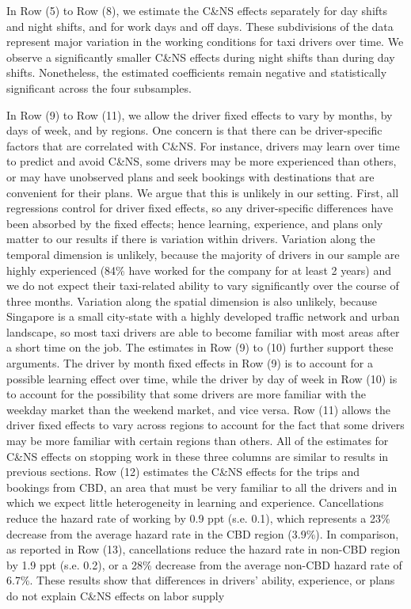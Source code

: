 \documentclass[reviewmode,AEJ]{AEA}
\begin{document}
In Row (5) to Row (8), we  estimate the C\&NS effects separately for day shifts and night shifts, and for work days and off days. These subdivisions of the data represent major variation in the working conditions for taxi drivers over time. We observe a significantly smaller C\&NS effects during night shifts than during day shifts. Nonetheless, the estimated coefficients remain negative and statistically significant across the four subsamples.


In Row (9) to Row (11), we allow the driver fixed effects to vary by months, by days of week, and by regions. One concern is that there can be driver-specific factors that  are correlated with C\&NS. For instance, drivers may learn over time to predict and avoid C\&NS, some drivers may be more experienced than others, or may have unobserved plans and seek bookings with destinations that are convenient for their plans. We argue that this is unlikely in our setting. First, all regressions control for driver fixed effects, so any driver-specific differences have been absorbed by the fixed effects;
hence learning, experience, and plans only matter to our results if there is variation within drivers. 
Variation along the temporal dimension is unlikely, because the majority of drivers in our sample are highly
experienced (84\% have worked for the company for at least 2 years) and we do not expect their taxi-related
ability to vary significantly over the course of three months. Variation along the spatial dimension is also
unlikely, because Singapore is a small city-state with a highly developed traffic network and urban landscape,
so most taxi drivers are able to become familiar with most areas after a short time on the job. The estimates in Row (9) to (10) further support these arguments. The driver by month fixed effects in Row (9) is to account for a possible learning effect over time, while the driver by day of week in Row (10) is to account for the possibility that some drivers are more familiar with the weekday market than the weekend market, and vice versa. Row (11) allows the driver fixed effects to vary across regions to account for the fact 
that some drivers may be more familiar with certain regions than others. All of the estimates for C\&NS effects
on stopping work in these three columns are similar to results in previous sections. Row (12) estimates the C\&NS effects for the trips and bookings from CBD, an area that must be very familiar to all the drivers and in which we expect little heterogeneity in
learning and experience. Cancellations reduce the hazard rate of working by 0.9 ppt (s.e. 0.1), which 
represents a 23\% decrease from the average hazard rate in the CBD region (3.9\%). In comparison, as
reported in Row (13), cancellations reduce the hazard rate in non-CBD region by 1.9 ppt (s.e. 0.2), 
or a 28\% decrease from the average non-CBD hazard rate of 6.7\%. These results show that differences in
drivers' ability, experience, or plans do not explain C\&NS effects on labor supply
\end{document}
